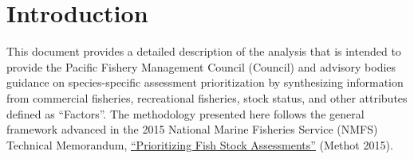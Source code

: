 \documentclass[11pt,
  english,
  a4paper,
]{article}
\begin{document}
\newcommand{\lt}{\ensuremath <}
\newcommand{\gt}{\ensuremath >}

\pagebreak
{}
\setcounter{page}{1}

\renewcommand{\thetable}{\roman{table}}
\renewcommand{\thefigure}{\roman{figure}}

\setlength\parskip{0.5em plus 0.1em minus 0.2em}

\pagebreak
\setlength{\parskip}{5mm plus1mm minus1mm}
\setcounter{page}{1}
\renewcommand{\thefigure}{\arabic{figure}}
\renewcommand{\thetable}{\arabic{table}}
\setcounter{table}{0}
\setcounter{figure}{0}

\setlength\parskip{0.5em plus 0.1em minus 0.2em}


\hypertarget{introduction}{%
\section{Introduction}\label{introduction}}

\leavevmode\tagmcend\tagstructend


This document provides a detailed description of the analysis that is intended to provide the Pacific Fishery Management Council (Council) and advisory bodies guidance on species-specific assessment prioritization by synthesizing information from commercial fisheries, recreational fisheries, stock status, and other attributes defined as ``Factors''. The methodology presented here follows the general framework advanced in the 2015 National Marine Fisheries Service (NMFS) Technical Memorandum, {\href{https://www.st.nmfs.noaa.gov/Assets/stock/documents/PrioritizingFishStockAssessments_FinalWeb.pdf}{``Prioritizing Fish Stock Assessments''}\leavevmode\tagmcend\tagstructend} {(Methot 2015)\leavevmode\tagmcend\tagstructend}.

\leavevmode\tagmcend\tagstructend\par

\end{document}
